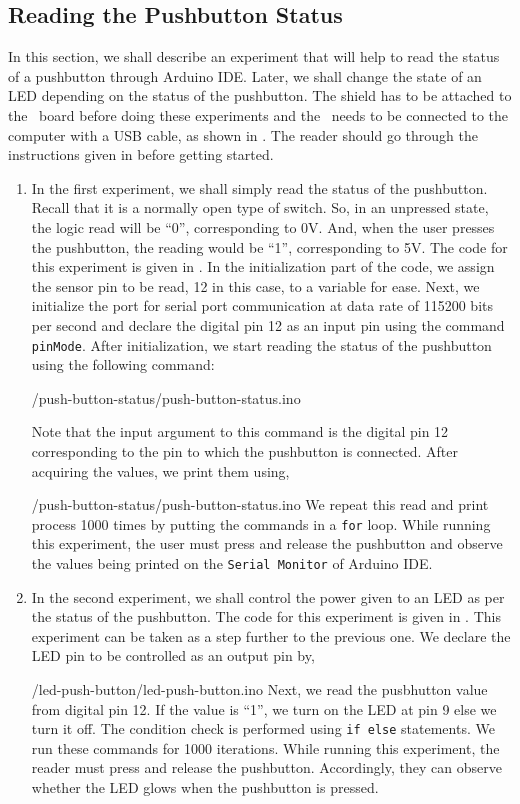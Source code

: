 \subsection{Reading the Pushbutton Status}
In this section, we shall describe an experiment that will help 
to read the status of a pushbutton through Arduino IDE. 
Later, we shall change the state of an LED depending on the status of the pushbutton. The shield has to be attached to the \arduino\ board
before doing these experiments and the \arduino\ needs to be connected to the computer 
with a USB cable, as shown in . The reader should go through the
instructions given in  before getting started.
\begin{enumerate}
\item In the first experiment, we shall simply read the status of the
  pushbutton. Recall that it is a normally open type of switch. So, in
  an unpressed state, the logic read will be ``0'', corresponding to
  0V. And, when the user presses the pushbutton, the reading would be
  ``1'', corresponding to 5V. The code for this experiment is given in
  . In the initialization part of the code, we
  assign the sensor pin to be read, 12 in this case, to a variable for
  ease. Next, we initialize the port for serial port communication at
  data rate of 115200 bits per second and declare the digital pin 12 as an 
  input pin using the command {\tt pinMode}.  After initialization, 
  we start reading the status of the pushbutton using the following command:
  
  {\LocPushardcode/push-button-status/push-button-status.ino}

  Note that the input argument to this command is the digital pin 12
  corresponding to the pin to which the pushbutton is connected.  After
  acquiring the values, we print them using,
  
  {\LocPushardcode/push-button-status/push-button-status.ino} We
  repeat this read and print process 1000 times by putting the
  commands in a {\tt for} loop. While running this experiment, the user must press
  and release the pushbutton and observe the values being printed on the
  {\tt Serial Monitor} of Arduino IDE.

\item In the second experiment, we shall control the power given to an
  LED as per the status of the pushbutton. The code for this
  experiment is given in . This experiment can be
  taken as a step further to the previous one. We declare the LED pin
  to be controlled as an output pin by,
  
  {\LocPushardcode/led-push-button/led-push-button.ino} Next, we read
  the pusbhutton value from digital pin 12. If the value is ``1'',
  we turn on the LED at pin 9 else we turn it off. The
  condition check is performed using {\tt if else} statements. We run
  these commands for 1000 iterations. While running this experiment, the reader 
  must press and release the pushbutton. Accordingly, they can observe whether 
  the LED glows when the pushbutton is pressed. 
\end{enumerate}

